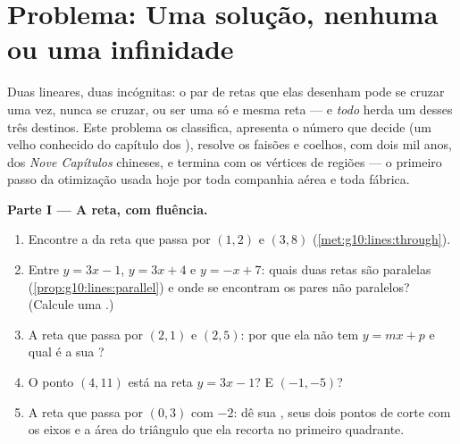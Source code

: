 \section{Problema: Uma solução, nenhuma ou uma infinidade}

\begin{problem}
\label{pb:g10:lines:1}
Duas  lineares, duas incógnitas: o par de retas que elas
desenham pode se cruzar uma vez, nunca se cruzar, ou ser uma só e
mesma reta --- e \emph{todo}  herda um desses três
destinos. Este problema os classifica, apresenta o número que
decide (um velho conhecido do capítulo dos ), resolve os
faisões e coelhos, com dois mil anos, dos \emph{Nove Capítulos}
chineses, e termina com os vértices de regiões --- o primeiro
passo da otimização usada hoje por toda companhia aérea e toda
fábrica.

\medskip
\noindent\textbf{Parte I --- A reta, com fluência.}
\begin{enumerate}
  \item Encontre a  da reta que passa por
        $(1, 2)$ e $(3, 8)$
        (\cref{met:g10:lines:through}).
  \item Entre $y = 3x - 1$, $y = 3x + 4$ e $y = -x + 7$: quais
        duas retas são paralelas
        (\cref{prop:g10:lines:parallel}) e onde se encontram os
        pares não paralelos? (Calcule uma .)
  \item A reta que passa por $(2, 1)$ e $(2, 5)$: por que ela não
        tem  $y = mx + p$ e qual é a sua ?
  \item O ponto $(4, 11)$ está na reta $y = 3x - 1$? E
        $(-1, -5)$?
  \item A reta que passa por $(0, 3)$ com 
        $-2$: dê sua , seus dois pontos de corte com os
        eixos e a área do triângulo que ela recorta no primeiro
        quadrante.
\end{enumerate}


\end{problem}
